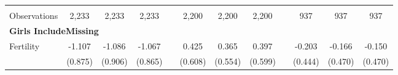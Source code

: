 \begin{landscape}
\begin{table}[htpb!]
\begin{center}
\begin{tabular}{lcccp{2mm}cccp{2mm}ccc}
\begin{footnotesize}\end{footnotesize}&\begin{footnotesize}\end{footnotesize}&\begin{footnotesize}\end{footnotesize}&\begin{footnotesize}\end{footnotesize}&\begin{footnotesize}\end{footnotesize}&\begin{footnotesize}\end{footnotesize}&\begin{footnotesize}\end{footnotesize}&\begin{footnotesize}\end{footnotesize}&\begin{footnotesize}\end{footnotesize}&\begin{footnotesize}\end{footnotesize}&\begin{footnotesize}\end{footnotesize}&\begin{footnotesize}\end{footnotesize}\\Observations&2,233&2,233&2,233&&2,200&2,200&2,200&&937&937&937\\
\multicolumn{12}{l}{\textbf{Girls IncludeMissing}}\\ 
Fertility&-1.107&-1.086&-1.067&&0.425&0.365&0.397&&-0.203&-0.166&-0.150\\
&(0.875)&(0.906)&(0.865)&&(0.608)&(0.554)&(0.599)&&(0.444)&(0.470)&(0.470)\\

\end{tabular}
\end{center}
\end{table}
\end{landscape}
